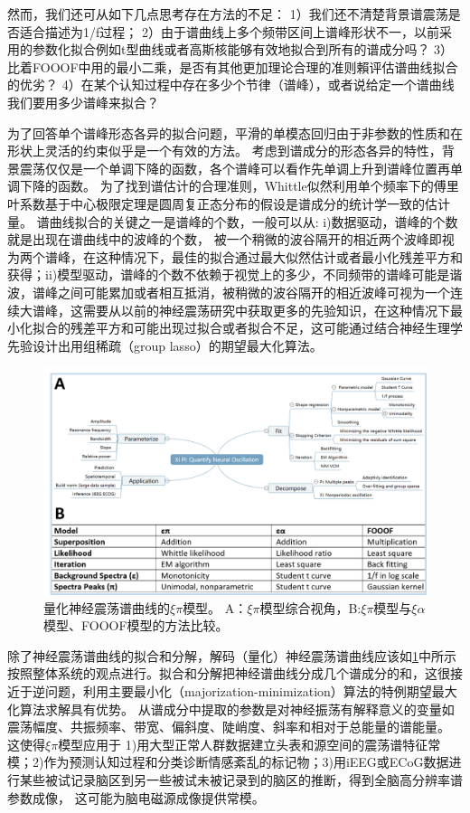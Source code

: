 然而，我们还可从如下几点思考存在方法的不足：
1）我们还不清楚背景谱震荡是否适合描述为1/f过程； 2）由于谱曲线上多个频带区间上谱峰形状不一，以前采用的参数化拟合例如t型曲线或者高斯核能够有效地拟合到所有的谱成分吗？ 3）比着FOOOF中用的最小二乘，是否有其他更加理论合理的准则賴评估谱曲线拟合的优劣？
4）在某个认知过程中存在多少个节律（谱峰），或者说给定一个谱曲线我们要用多少谱峰来拟合？

为了回答单个谱峰形态各异的拟合问题，平滑的单模态回归由于非参数的性质和在形状上灵活的约束似乎是一个有效的方法。 考虑到谱成分的形态各异的特性，背景震荡仅仅是一个单调下降的函数，各个谱峰可以看作先单调上升到谱峰位置再单调下降的函数。 为了找到谱估计的合理准则，Whittle似然利用单个频率下的傅里叶系数基于中心极限定理是圆周复正态分布的假设是谱成分的统计学一致的估计量。 谱曲线拟合的关键之一是谱峰的个数，一般可以从: i)数据驱动，谱峰的个数就是出现在谱曲线中的波峰的个数， 被一个稍微的波谷隔开的相近两个波峰即视为两个谱峰，在这种情况下，最佳的拟合通过最大似然估计或者最小化残差平方和获得；ii)模型驱动，谱峰的个数不依赖于视觉上的多少，不同频带的谱峰可能是谐波，谱峰之间可能累加或者相互抵消，被稍微的波谷隔开的相近波峰可视为一个连续大谱峰，这需要从以前的神经震荡研究中获取更多的先验知识，在这种情况下最小化拟合的残差平方和可能出现过拟合或者拟合不足，这可能通过结合神经生理学先验设计出用组稀疏（group lasso）的期望最大化算法。
\begin{figure}
\includegraphics[width=15cm]{pic/xipi/model.png}
\caption{量化神经震荡谱曲线的$\xi\pi$模型。 A：$\xi\pi$模型综合视角，B:$\xi\pi$模型与$\xi\alpha$模型、FOOOF模型的方法比较。}
\label{model}
\end{figure}

除了神经震荡谱曲线的拟合和分解，解码（量化）神经震荡谱曲线应该如\ref{model}中所示按照整体系统的观点进行。拟合和分解把神经谱曲线分成几个谱成分的和，这很接近于逆问题，利用主要最小化（majorization-minimization）算法的特例期望最大化算法求解具有优势。 从谱成分中提取的参数是对神经振荡有解释意义的变量如震荡幅度、共振频率、带宽、偏斜度、陡峭度、斜率和相对于总能量的谱能量。 这使得$\xi\pi$模型应用于 1)用大型正常人群数据建立头表和源空间的震荡谱特征常模；2)作为预测认知过程和分类诊断情感紊乱的标记物；3)用iEEG或ECoG数据进行某些被试记录脑区到另一些被试未被记录到的脑区的推断，得到全脑高分辨率谱参数成像，
这可能为脑电磁源成像提供常模。

